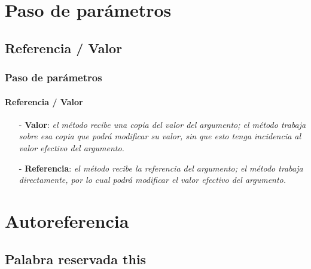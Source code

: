 \documentclass{beamer}
\begin{document}
    \section{Paso de par\'ametros}
    
		\subsection{Referencia / Valor}

        \begin{frame}
			\frametitle{Paso de par\'ametros}
			\framesubtitle{Referencia / Valor}

			\begin{block}{}
			    {\scriptsize
                    \begin{itemize}
                        \item[-] \textbf{Valor}: \emph{el m\'etodo recibe una copia del valor del argumento; el m\'etodo trabaja sobre esa copia que podr\'a modificar su valor, sin que esto tenga incidencia al valor efectivo del argumento.}
                        \item[-] \textbf{Referencia}: \emph{el m\'etodo recibe la referencia del argumento; el m\'etodo trabaja directamente, por lo cual podr\'a modificar el valor efectivo del argumento.}
                    \end{itemize}
			    }
			\end{block}
		\end{frame}

    \section{Autoreferencia}
    
        \subsection{Palabra reservada this}
\end{document}

